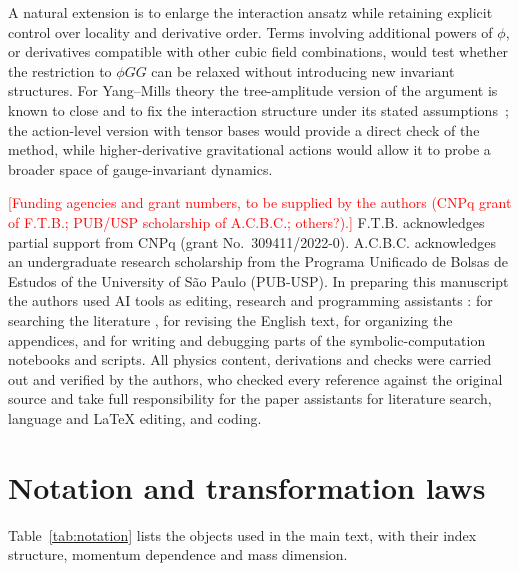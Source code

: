 \documentclass[prd,aps,preprint,superscriptaddress,nofootinbib,amsmath,amssymb,eqsecnum]{revtex4-2}
\newcommand{\todo}[1]{\textcolor{red}{[#1]}}
\providecommand{\DIFaddtex}[1]{{\protect\color{blue} \sf #1}} %
\providecommand{\DIFdeltex}[1]{{\protect\color{red} \scriptsize #1}} %
\providecommand{\DIFaddbegin}{} %
\providecommand{\DIFaddend}{} %
\providecommand{\DIFdelbegin}{} %
\providecommand{\DIFdelend}{} %
\providecommand{\DIFadd}[1]{\texorpdfstring{\DIFaddtex{#1}}{#1}} %
\providecommand{\DIFdel}[1]{\texorpdfstring{\DIFdeltex{#1}}{}} %
\begin{document}
A natural extension is to enlarge the interaction ansatz while retaining explicit control
over locality and derivative order. Terms involving additional powers of $\phi$, or
derivatives compatible with other cubic field combinations, would test whether the
restriction to $\phi GG$ can be relaxed without introducing new invariant structures.
For Yang--Mills theory the tree-amplitude version of the argument is known to close and
to fix the interaction structure under its stated assumptions~\cite{BrandtFrenkel1996}; the
action-level version with tensor bases would provide a direct check of the method, while higher-derivative gravitational
actions would allow it to probe a broader space of gauge-invariant dynamics.

\begin{acknowledgments}
\DIFdelbegin \DIFdel{\todo{Funding agencies and grant numbers, to be supplied by the authors (CNPq grant of
F.T.B.; PUB/USP scholarship of A.C.B.C.; others?).}
}\DIFdelend \DIFaddbegin \DIFadd{F.T.B. acknowledges partial support from CNPq (grant No.~309411/2022-0).
A.C.B.C. acknowledges an undergraduate research scholarship from the Programa Unificado de
Bolsas de Estudos of the University of S\~ao Paulo (PUB-USP).
}\DIFaddend In preparing this manuscript the authors used AI tools as \DIFdelbegin \DIFdel{editing, research and programming
assistants : for
searching the literature , for revising the English text, for
organizing the appendices, and for writing and debugging parts of the symbolic-computation
notebooks and scripts. All physics content, derivations and checks were carried out and
verified by the authors, who checked every reference against the original source and take
full responsibility for the paper}\DIFdelend \DIFaddbegin \DIFadd{assistants for
literature search, language and LaTeX editing, and coding}\DIFaddend .
\end{acknowledgments}

\appendix

\section{Notation and transformation laws}
\label{app:transf}

Table~\ref{tab:notation} lists the objects used in the main text, with their index
structure, momentum dependence and mass dimension.
\end{document}
